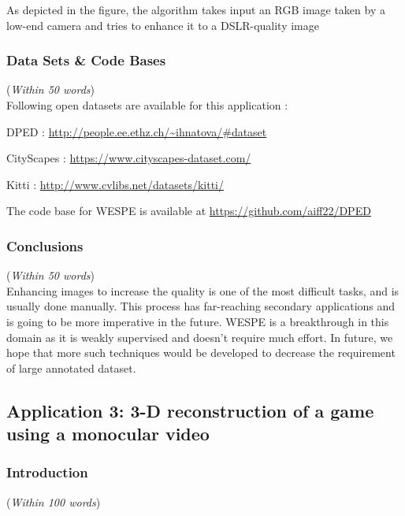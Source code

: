 \documentclass[11pt]{article}
\begin{document}
As depicted in the figure, the algorithm takes input an RGB image taken by a low-end camera and tries to enhance it to a DSLR-quality image

\subsubsection{Data Sets \& Code Bases}
({\em Within 50 words}) \\

Following open datasets are available for this application :

DPED : \url{http://people.ee.ethz.ch/~ihnatova/#dataset}

CityScapes : \url{https://www.cityscapes-dataset.com/}

Kitti : \url{http://www.cvlibs.net/datasets/kitti/}

The code base for WESPE is available at 
\url{https://github.com/aiff22/DPED}

\subsubsection{Conclusions}
({\em Within 50 words}) \\

Enhancing images to increase the quality is one of the most difficult tasks, and is usually done manually. This process has far-reaching secondary applications and is going to be more imperative in the future. WESPE is a breakthrough in this domain as it is weakly supervised and doesn't require much effort. In future, we hope that more such techniques would be developed to decrease the requirement of large annotated dataset.


\subsection{Application 3: 3-D reconstruction of a game using a monocular video}
\subsubsection{Introduction} 
({\em Within 100 words}) \\
\end{document}
